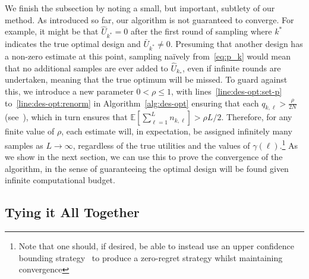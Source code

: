 We finish the subsection by noting a small, but important, subtlety of our method.  As introduced so far, our algorithm
is not guaranteed to converge.  For example, it might be that $\hat{U}_{k^*} =0$ after the first round
of sampling where $k^*$ indicates the true optimal design and $\bar{U}_{k^*} \ne0$.  
Presuming that another design has a non-zero estimate at this point, sampling na\"{i}vely from~\eqref{eq:p_k} would 
mean that no additional samples are ever added to $\hat{U}_{k_*}$, even if infinite rounds are undertaken,
meaning that the true optimum will be missed.  To guard against this, we introduce a new parameter $0<\rho\le1$, 
with lines~\ref{line:des-opt:set-p} to~\ref{line:des-opt:renorm} in Algorithm~\ref{alg:des-opt}
ensuring that each $q_{k,\ell}>\frac{\rho}{2N}$ (see~\cite{vincent2017darc}), which in turn ensures that  
$\mathbb{E}\left[\sum_{\ell=1}^{L} n_{k,\ell}\right] >\rho L/2$.
Therefore, for any finite value of $\rho$, each
estimate will, in expectation, be assigned infinitely many samples as $L\rightarrow\infty$, regardless
of the true utilities and the values of $\gamma(\ell)$.\footnote{Note that one should, if desired, be able to instead 
	use an upper confidence bounding strategy~\citep{auer2002using} to produce a zero-regret 
	strategy whilst maintaining convergence}
As we show in the next section, we can
use this to prove the convergence of the algorithm, in the sense of guaranteeing the optimal design
will be found given infinite computational budget.

\subsection{Tying it All Together}
\label{sec:tying-together}


